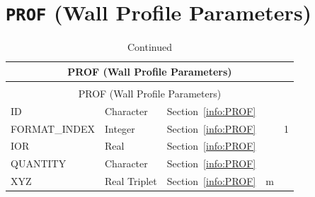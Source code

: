 \documentclass[11pt]{book}
\begin{document}

\vspace{\baselineskip}


\section{\texorpdfstring{{\tt PROF}}{PROF} (Wall Profile Parameters)}

\begin{longtable}{@{\extracolsep{\fill}}|l|l|l|l|l|}
\caption[Wall profile parameters ({\ct PROF} namelist group)]{For more information see Section~\ref{info:PROF}.}
\label{tbl:PROF} \\
\hline
\multicolumn{5}{|c|}{{\ct PROF} (Wall Profile Parameters)} \\
\hline \hline
\endfirsthead
\caption[]{Continued} \\
\hline
\multicolumn{5}{|c|}{{\ct PROF} (Wall Profile Parameters)} \\
\hline \hline
\endhead
{\ct ID}                    & Character         & Section~\ref{info:PROF}      &            &       \\ \hline
{\ct FORMAT\_INDEX}         & Integer           & Section~\ref{info:PROF}      &            & 1     \\ \hline
{\ct IOR}                   & Real              & Section~\ref{info:PROF}      &            &       \\ \hline
{\ct QUANTITY}              & Character         & Section~\ref{info:PROF}      &            &       \\ \hline
{\ct XYZ}                   & Real Triplet      & Section~\ref{info:PROF}      & m          &       \\ \hline
\end{longtable}

\vspace{\baselineskip}
\end{document}
